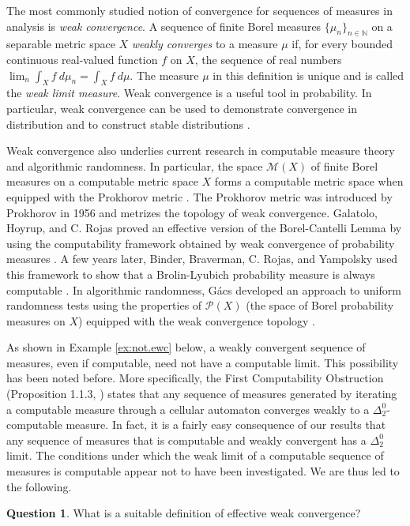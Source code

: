 \documentclass{amsart}
\newcommand{\N}{\mathbb{N}}
\renewcommand{\P}{\mathcal{P}}
\newcommand{\M}{\mathcal{M}}
\theoremstyle{definition}
\newtheorem{question}[theorem]{Question}
\numberwithin{equation}{section}
\begin{document}
The most commonly studied notion of convergence for sequences of measures in analysis is \emph{weak convergence}. 
A sequence of finite Borel measures $\{\mu_n\}_{n\in\N}$ on a separable metric space $X$ \emph{weakly converges} to a measure $\mu$ if, for every bounded continuous real-valued function $f$ on $X$, the sequence of real numbers $\lim_n \int_X f\ d\mu_n = \int_X f\ d\mu$. 
The measure $\mu$ in this definition is unique and is called the \emph{weak limit measure}.  Weak convergence is a useful tool in probability.   In particular, weak convergence can be used to demonstrate convergence in distribution and to construct stable distributions \cite{Durrett.2010}.

Weak convergence also underlies current research in computable measure theory and algorithmic randomness.  
In particular, the space $\M(X)$ of finite Borel measures on a computable metric space $X$ forms a computable metric space when equipped with the Prokhorov metric \cite{HR09b}.  The Prokhorov metric was introduced by Prokhorov \cite{P56} in 1956 and metrizes the topology of weak convergence.
Galatolo, Hoyrup, and C. Rojas proved an effective version of the Borel-Cantelli  Lemma by using the computability framework obtained by weak convergence of probability measures \cite{GHR09}. 
A few years later, Binder, Braverman, C. Rojas, and Yampolsky used this framework to show that a Brolin-Lyubich probability measure is always computable \cite{BBRY11}. 
In algorithmic randomness, G\'{a}cs developed an approach to uniform randomness tests using the properties of $\P(X)$ (the space of Borel probability measures on $X$) equipped with the weak convergence topology \cite{G05}. 

As shown in Example \ref{ex:not.ewc} below, a weakly convergent sequence of measures, even if computable, need not have a computable limit.  
This possibility has been noted before.  
More specifically, the First Computability Obstruction (Proposition 1.1.3, \cite{H14}) states that any sequence of measures generated by iterating a computable measure through a cellular automaton converges weakly to a $\Delta^0_2$-computable measure.  In fact, it is a fairly easy consequence of our results that any sequence of measures that is computable and weakly convergent has a $\Delta^0_2$ limit.
The conditions under which the weak limit of a computable sequence of measures is computable appear not to have been investigated.  We are thus led to the following.
\begin{question}
What is a suitable definition of effective weak convergence?
\end{question}
\end{document}
